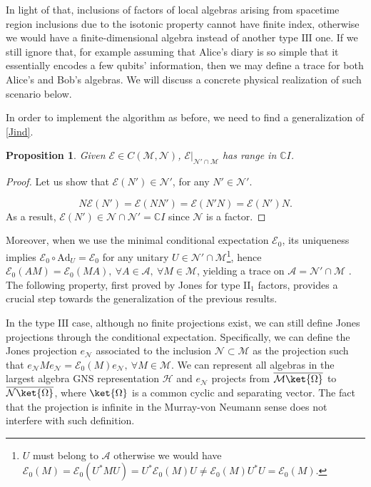 \documentclass[a4paper,11pt]{article}
\newtheorem{Proposition}{Proposition}[subsection]
\begin{document}
In light of that, inclusions of factors of local algebras arising from spacetime region inclusions due to the isotonic property cannot have finite index, otherwise we would have a finite-dimensional algebra instead of another type $\mathrm{III}$ one. If we still ignore that, for example assuming that Alice's diary is so simple that it essentially encodes a few qubits' information, then we may define a trace for both Alice's and Bob's algebras. We will discuss a concrete physical realization of such scenario below.

In order to implement the algorithm as before, we need to find a generalization of \ref{Jind}.

\begin{Proposition}
    Given $\mathcal{E} \in C(\mathcal{M}, \mathcal{N})$, $\left. \mathcal{E} \right|_{\mathcal{N}' \cap \mathcal{M}}$ has range in $\mathbb{C} I$.
    \label{expectation scalar}
\end{Proposition}

\begin{proof}
    Let us show that $\mathcal{E}(N') \in \mathcal{N}'$, for any $N' \in \mathcal{N}'$.

    \begin{equation}
        N \mathcal{E}(N') = \mathcal{E}(N N') = \mathcal{E} (N' N) = \mathcal{E}(N') N \text{.}
    \end{equation}
    As a result, $\mathcal{E}(N') \in \mathcal{N} \cap \mathcal{N}' = \mathbb{C}I$ since $\mathcal{N}$ is a factor.
\end{proof}

Moreover, when we use the minimal conditional expectation $\mathcal{E}_0$, its uniqueness implies $\mathcal{E}_0 \circ \mathrm{Ad}_{U} = \mathcal{E}_0$ for any unitary $U \in \mathcal{N}' \cap \mathcal{M}$\footnote{$U$ must belong to $\mathcal{A}$ otherwise we would have $\mathcal{E}_0(M) = \mathcal{E}_0(U^*MU) = U^* \mathcal{E}_0(M) U \neq \mathcal{E}_0(M) U^* U = \mathcal{E}_0(M)$.}, hence $\mathcal{E}_0 (AM) = \mathcal{E}_0(MA), \ \forall A \in \mathcal{A}, \ \forall M \in \mathcal{M}$, yielding a trace on $\mathcal{A} = \mathcal{N}' \cap \mathcal{M}$ \cite{Longo}. The following property, first proved by Jones \cite{Jones} for type $\mathrm{II}_1$ factors, provides a crucial step towards the generalization of the previous results.

In the type $\mathrm{III}$ case, although no finite projections exist, we can still define Jones projections through the conditional expectation. Specifically, we can define the Jones projection $e_{\mathcal{N}}$ associated to the inclusion $\mathcal{N} \subset \mathcal{M}$ as the projection such that $e_{\mathcal{N}} M e_{\mathcal{N}} = \mathcal{E}_0(M) e_{\mathcal{N}}, \ \forall M \in \mathcal{M}$. We can represent all algebras in the largest algebra GNS representation $\mathcal{H}$ and $e_{\mathcal{N}}$ projects from $\overline{\mathcal{M}\ket{\Omega}}$ to $\overline{\mathcal{N}\ket{\Omega}}$, where $\ket{\Omega}$ is a common cyclic and separating vector. The fact that the projection is infinite in the Murray-von Neumann sense does not interfere with such definition.
\end{document}
